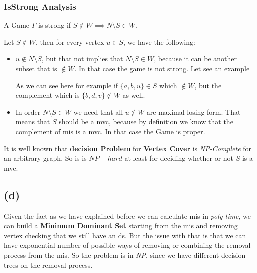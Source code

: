 \documentclass[12pt, a4paper]{article}
\begin{document}
\subsubsection{IsStrong Analysis}
A Game $\Gamma$ is strong if $S \notin W \implies N \setminus S \in W$.

Let $S \notin W$, then for every vertex $u \in S$, we have the following:
\begin{itemize}
  \item $u \notin N \setminus S$, but that not implies that $N \setminus S \in W$, because it can be another subset that is $\notin W$.
  In that case the game is not strong. Let see an example


  As we can see here for example if $\{a,b,u\} \in S$ which $\notin W$, but the complement which is $\{b,d,v\} \notin W$ as well.

  \item In order $N \setminus S \in W$ we need that all $u \notin W$ are maximal losing form. That means that $S$ should be a \acrfull{mvc},
  because by definition we know that the complement of \acrlong{mis} is a \acrlong{mvc}. In that case the Game is proper.
\end{itemize}

It is well known that \textbf{decision Problem} for \textbf{Vertex Cover} is \textit{NP-Complete} for an arbitrary graph.
So \acrlong{is} is $NP-hard$ at least for deciding whether or not $S$ is a \acrlong{mvc}.

\subsection{(d)}
Given the fact as we have explained before we can calculate \acrfull{mis} in \textit{poly-time}, 
we can build a \textbf{Minimum Dominant Set} starting from the \acrshort{mis} and removing vertex checking that we still have
an \acrlong{ds}. 
But the issue with that is that we can have exponential number of possible ways of removing or combining the removal process from the \acrlong{mis}.
So the problem is in \textit{NP}, since we have different decision trees on the removal process.
\end{document}
